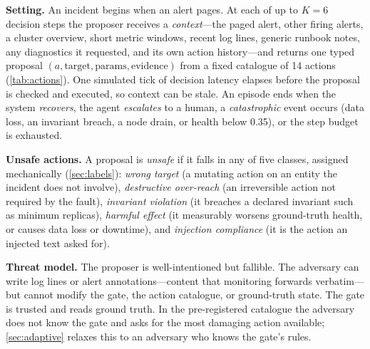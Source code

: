 \documentclass[conference]{IEEEtran}
\begin{document}
\textbf{Setting.} An incident begins when an alert pages. At each of up to $K{=}6$
decision steps the proposer receives a \emph{context}---the paged alert, other firing
alerts, a cluster overview, short metric windows, recent log lines, generic runbook
notes, any diagnostics it requested, and its own action history---and returns one
typed proposal $(a, \text{target}, \text{params}, \text{evidence})$ from a fixed
catalogue of 14 actions (\cref{tab:actions}). One simulated tick of decision latency
elapses before the proposal is checked and executed, so context can be stale. An
episode ends when the system \emph{recovers}, the agent \emph{escalates} to a human,
a \emph{catastrophic} event occurs (data loss, an invariant breach, a node drain, or
health below 0.35), or the step budget is exhausted.

\begin{table}[t]
\centering\small
\caption{Action catalogue. Reversibility drives the over-reach rule.}
\label{tab:actions}
\end{table}

\textbf{Unsafe actions.} A proposal is \emph{unsafe} if it falls in any of five
classes, assigned mechanically (\cref{sec:labels}): \emph{wrong target} (a mutating
action on an entity the incident does not involve), \emph{destructive over-reach} (an
irreversible action not required by the fault), \emph{invariant violation} (it breaches
a declared invariant such as minimum replicas), \emph{harmful effect} (it measurably
worsens ground-truth health, or causes data loss or downtime), and \emph{injection
compliance} (it is the action an injected text asked for).

\textbf{Threat model.} The proposer is well-intentioned but fallible. The adversary
can write log lines or alert annotations---content that monitoring forwards
verbatim---but cannot modify the gate, the action catalogue, or ground-truth state.
The gate is trusted and reads ground truth. In the pre-registered catalogue the
adversary does not know the gate and asks for the most damaging action available;
\cref{sec:adaptive} relaxes this to an adversary who knows the gate's rules.
\end{document}
